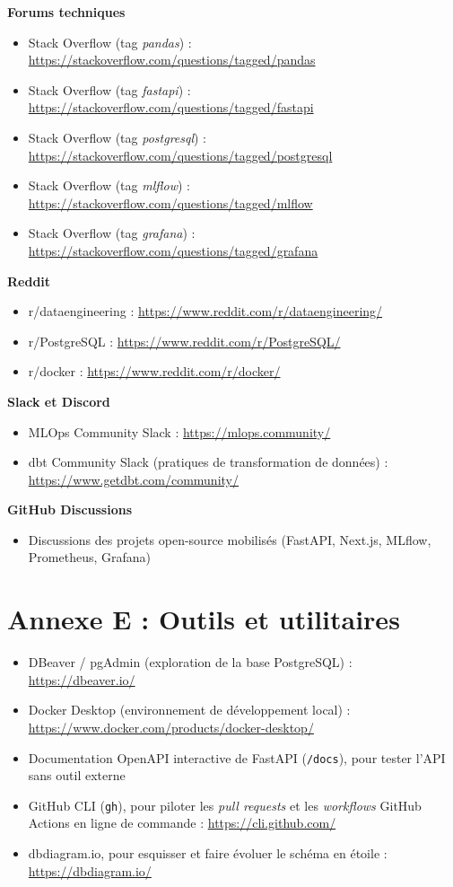 \documentclass[11pt,a4paper]{report}
\newcommand{\code}[1]{\lstinline{#1}}
\begin{document}
\textbf{Forums techniques}
\begin{itemize}
  \item Stack Overflow (tag \emph{pandas}) : \url{https://stackoverflow.com/questions/tagged/pandas}
  \item Stack Overflow (tag \emph{fastapi}) : \url{https://stackoverflow.com/questions/tagged/fastapi}
  \item Stack Overflow (tag \emph{postgresql}) : \url{https://stackoverflow.com/questions/tagged/postgresql}
  \item Stack Overflow (tag \emph{mlflow}) : \url{https://stackoverflow.com/questions/tagged/mlflow}
  \item Stack Overflow (tag \emph{grafana}) : \url{https://stackoverflow.com/questions/tagged/grafana}
\end{itemize}

\textbf{Reddit}
\begin{itemize}
  \item r/dataengineering : \url{https://www.reddit.com/r/dataengineering/}
  \item r/PostgreSQL : \url{https://www.reddit.com/r/PostgreSQL/}
  \item r/docker : \url{https://www.reddit.com/r/docker/}
\end{itemize}

\textbf{Slack et Discord}
\begin{itemize}
  \item MLOps Community Slack : \url{https://mlops.community/}
  \item dbt Community Slack (pratiques de transformation de données) : \url{https://www.getdbt.com/community/}
\end{itemize}

\textbf{GitHub Discussions}
\begin{itemize}
  \item Discussions des projets open-source mobilisés (FastAPI, Next.js, MLflow, Prometheus, Grafana)
\end{itemize}

\section*{Annexe E : Outils et utilitaires}

\begin{itemize}
  \item DBeaver / pgAdmin (exploration de la base PostgreSQL) : \url{https://dbeaver.io/}
  \item Docker Desktop (environnement de développement local) : \url{https://www.docker.com/products/docker-desktop/}
  \item Documentation OpenAPI interactive de FastAPI (\code{/docs}), pour tester l'API sans outil externe
  \item GitHub CLI (\code{gh}), pour piloter les \emph{pull requests} et les \emph{workflows} GitHub Actions en ligne de commande : \url{https://cli.github.com/}
  \item dbdiagram.io, pour esquisser et faire évoluer le schéma en étoile : \url{https://dbdiagram.io/}
\end{itemize}
\end{document}
